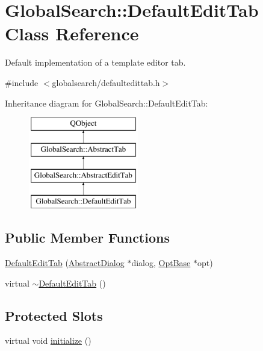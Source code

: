 \hypertarget{classGlobalSearch_1_1DefaultEditTab}{}\section{Global\+Search\+:\+:Default\+Edit\+Tab Class Reference}
\label{classGlobalSearch_1_1DefaultEditTab}


Default implementation of a template editor tab.  




{\ttfamily \#include $<$globalsearch/defaultedittab.\+h$>$}

Inheritance diagram for Global\+Search\+:\+:Default\+Edit\+Tab\+:\begin{figure}[H]
\begin{center}
\leavevmode
\includegraphics[height=4.000000cm]{classGlobalSearch_1_1DefaultEditTab}
\end{center}
\end{figure}
\subsection*{Public Member Functions}
\begin{DoxyCompactItemize}
\item 
\hyperlink{classGlobalSearch_1_1DefaultEditTab_ae511483de60e194bcf2e82e931da541d}{Default\+Edit\+Tab} (\hyperlink{classGlobalSearch_1_1AbstractDialog}{Abstract\+Dialog} $\ast$dialog, \hyperlink{classGlobalSearch_1_1OptBase}{Opt\+Base} $\ast$opt)
\item 
virtual \hyperlink{classGlobalSearch_1_1DefaultEditTab_ab2b458010ec73753f0e00b568af00d0b}{$\sim$\+Default\+Edit\+Tab} ()
\end{DoxyCompactItemize}
\subsection*{Protected Slots}
\begin{DoxyCompactItemize}
\item 
virtual void \hyperlink{classGlobalSearch_1_1DefaultEditTab_aabb8111d57852154b366640b728baabb}{initialize} ()
\end{DoxyCompactItemize}
